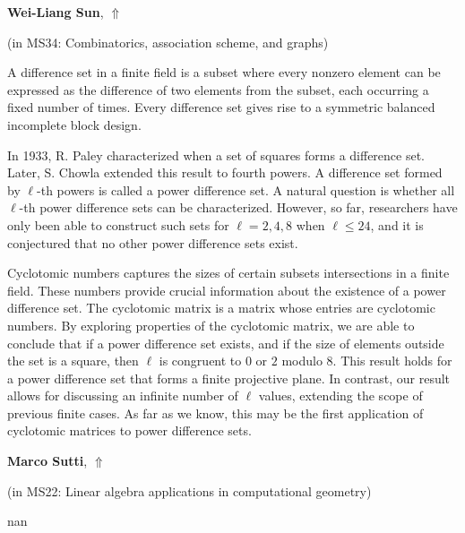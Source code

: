 \documentclass[ILAS2025-program.tex]{subfiles}
\begin{document}
     \hypertarget{down0326}{}\begin{ilasabstract}
    
    \textbf{Wei-Liang Sun},  \hfill \hyperlink{up0326}{$\Uparrow$}
    
    (in {\color{mstitle}MS34: Combinatorics, association scheme, and graphs})
        
        \mtskip
    A difference set in a finite field is a subset where every nonzero element can be expressed as the difference of two elements from the subset, each occurring a fixed number of times. Every difference set gives rise to a symmetric balanced incomplete block design.

In 1933, R. Paley characterized when a set of squares forms a difference set. Later, S. Chowla extended this result to fourth powers. A difference set formed by $\ell$-th powers is called a power difference set. A natural question is whether all $\ell$-th power difference sets can be characterized. However, so far, researchers have only been able to construct such sets for $\ell = 2, 4, 8$ when $\ell \leq 24$, and it is conjectured that no other power difference sets exist.

Cyclotomic numbers captures the sizes of certain subsets intersections in a finite field. These numbers provide crucial information about the existence of a power difference set. The cyclotomic matrix is a matrix whose entries are cyclotomic numbers. By exploring properties of the cyclotomic matrix, we are able to conclude that if a power difference set exists, and if the size of elements outside the set is a square, then $\ell$ is congruent to $0$ or $2$ modulo $8$. This result holds for a power difference set that forms a finite projective plane. In contrast, our result allows for discussing an infinite number of $\ell$ values, extending the scope of previous finite cases. As far as we know, this may be the first application of cyclotomic matrices to power difference sets.
\end{ilasabstract}
     \hypertarget{down0036}{}\begin{ilasabstract}
    
    \textbf{Marco Sutti},  \hfill \hyperlink{up0036}{$\Uparrow$}
    
    (in {\color{mstitle}MS22: Linear algebra applications in computational geometry})
        
        \mtskip
    nan\end{ilasabstract}
\end{document}
